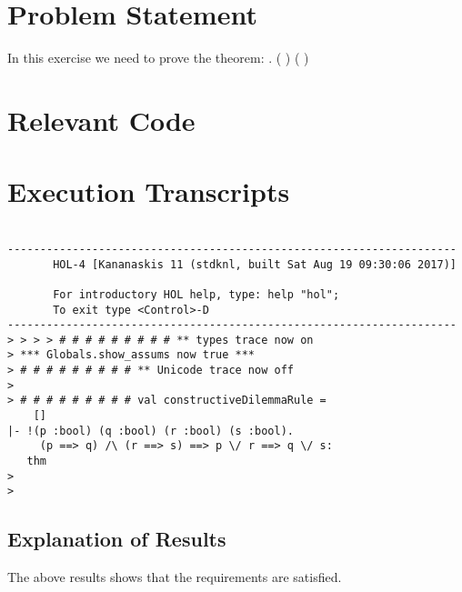 \documentclass{report}
\begin{document}
 \section{Problem Statement}
 \label{sec:problem-statement-2}

In this exercise we need to prove the theorem:
\HOLTokenTurnstile{} \HOLSymConst{\HOLTokenForall{}}   . ( \HOLSymConst{\HOLTokenImp{}} ) \HOLSymConst{\HOLTokenConj{}} ( \HOLSymConst{\HOLTokenImp{}} ) \HOLSymConst{\HOLTokenImp{}}  \HOLSymConst{\HOLTokenDisj{}}  \HOLSymConst{\HOLTokenImp{}}  \HOLSymConst{\HOLTokenDisj{}} 

\section{Relevant Code}
\label{sec:relevant-code-2}


\section{Execution Transcripts}
\label{sec:exec-transcr-2}

\setcounter{sessioncount}{0}
\begin{session}
  \begin{scriptsize}
\begin{verbatim}

---------------------------------------------------------------------
       HOL-4 [Kananaskis 11 (stdknl, built Sat Aug 19 09:30:06 2017)]

       For introductory HOL help, type: help "hol";
       To exit type <Control>-D
---------------------------------------------------------------------
> > > > # # # # # # # # # ** types trace now on
> *** Globals.show_assums now true ***
> # # # # # # # # # ** Unicode trace now off
> 
> # # # # # # # # # val constructiveDilemmaRule =
    []
|- !(p :bool) (q :bool) (r :bool) (s :bool).
     (p ==> q) /\ (r ==> s) ==> p \/ r ==> q \/ s:
   thm
> 
> 

\end{verbatim}
  \end{scriptsize}
\end{session}

\subsection{Explanation of Results}
\label{sec:explanation-results-2}
The above results shows that the requirements are satisfied.
\end{document}
